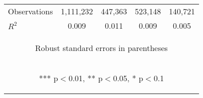 \documentclass[]{article}
\begin{document}
\begin{center}
\begin{tabular}{lcccc}
Observations & 1,111,232 & 447,363 & 523,148 & 140,721 \\
 $R^2$ & 0.009 & 0.011 & 0.009 & 0.005 \\ \hline
\multicolumn{5}{c}{\begin{footnotesize} Robust standard errors in parentheses\end{footnotesize}} \\
\multicolumn{5}{c}{\begin{footnotesize} *** p$<$0.01, ** p$<$0.05, * p$<$0.1\end{footnotesize}} \\
\end{tabular}
\end{center}
\end{document}
